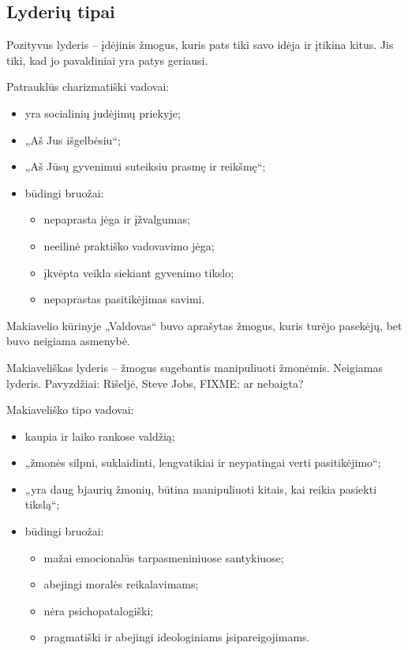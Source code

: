 \subsection{Lyderių tipai}

Pozityvus lyderis – įdėjinis žmogus, kuris pats tiki savo idėja ir įtikina
kitus. Jis tiki, kad jo pavaldiniai yra patys geriausi.

Patrauklūs charizmatiški vadovai:
\begin{itemize}
  \item yra socialinių judėjimų priekyje;
  \item „Aš Jus išgelbėsiu“;
  \item „Aš Jūsų gyvenimui suteiksiu prasmę ir reikšmę“;
  \item būdingi bruožai:
    \begin{itemize}
      \item nepaprasta jėga ir įžvalgumas;
      \item neeilinė praktiško vadovavimo jėga;
      \item įkvėpta veikla siekiant gyvenimo tikslo;
      \item nepaprastas pasitikėjimas savimi.
    \end{itemize}
\end{itemize}

Makiavelio kūrinyje „Valdovas“ buvo aprašytas žmogus, kuris turėjo
pasekėjų, bet buvo neigiama asmenybė.

Makiaveliškas lyderis – žmogus sugebantis manipuliuoti žmonėmis.
Neigiamas lyderis. Pavyzdžiai: Rišeljė, Steve Jobs, FIXME: ar nebaigta?

Makiaveliško tipo vadovai:
\begin{itemize}
  \item kaupia ir laiko rankose valdžią;
  \item „žmonės silpni, suklaidinti, lengvatikiai ir neypatingai verti
    pasitikėjimo“;
  \item „yra daug bjaurių žmonių, būtina manipuliuoti kitais, kai reikia
    pasiekti tikslą“;
  \item būdingi bruožai:
    \begin{itemize}
      \item mažai emocionalūs tarpasmeniniuose santykiuose;
      \item abejingi moralės reikalavimams;
      \item nėra psichopatalogiški;
      \item pragmatiški ir abejingi ideologiniams įsipareigojimams.
    \end{itemize}
\end{itemize}

